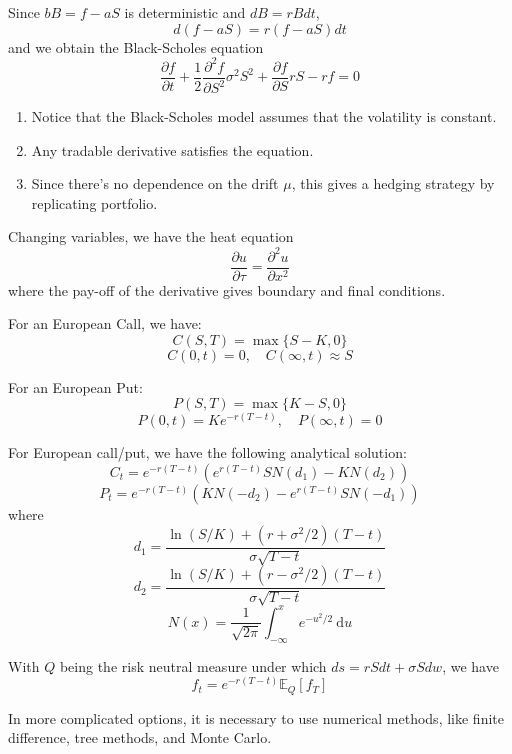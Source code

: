 Since $bB = f - aS$ is deterministic and $dB = rB dt$, 
\[
    d(f-aS) = r(f-aS) dt
\]
and we obtain the Black-Scholes equation
\[
    \frac{\partial f}{\partial t} + \frac{1}{2} \frac{\partial^2 f}{\partial S^2} \sigma^2 S^2 + \frac{\partial f}{\partial S} rS - rf = 0
\]

\begin{remark}
    \begin{enumerate}
        \item Notice that the Black-Scholes model assumes that the volatility is constant.
        \item Any tradable derivative satisfies the equation.
        \item Since there's no dependence on the drift $\mu$, this gives a hedging strategy by replicating portfolio. 
    \end{enumerate}
\end{remark}

Changing variables, we have the heat equation 
\[
    \frac{\partial u}{\partial \tau} = \frac{\partial^2 u}{\partial x^2}
\]
where the pay-off of the derivative gives boundary and final conditions.

For an European Call, we have: 
\[
    C(S,T) = \max \{ S-K, 0 \} 
\]
\[
    C(0, t) = 0, \quad C(\infty, t) \approx S
\]

For an European Put: 
\[
    P(S,T) = \max \{ K-S, 0 \} 
\]
\[
    P(0, t) = Ke^{-r(T-t)}, \quad P(\infty, t) = 0 
\]

For European call/put, we have the following analytical solution:
\[
    C_t = e^{-r(T-t)} \left( e^{r(T-t)} SN(d_1) - KN(d_2) \right)
\]
\[
    P_t = e^{-r(T-t)} \left( KN(-d_2) - e^{r(T-t)} SN(-d_1) \right)
\]
where 
\[
    d_1 = \frac{\ln(S/K) + (r + \sigma^2 / 2)(T-t)}{\sigma \sqrt{T-t}}
\]
\[
    d_2 = \frac{\ln(S/K) + (r - \sigma^2 / 2)(T-t)}{\sigma \sqrt{T-t}}
\]
\[
    N(x) = \frac{1}{\sqrt{2\pi}} \int_{- \infty}^x e^{-u^2 / 2}~\mathrm{d}u
\]

With $Q$ being the risk neutral measure under which $ds = rS dt + \sigma S dw$, we have
\[
    f_t = e^{-r(T-t)} \mathbb{E}_{Q}[f_T]
\]

In more complicated options, it is necessary to use numerical methods, like finite difference, tree methods, and Monte Carlo.



